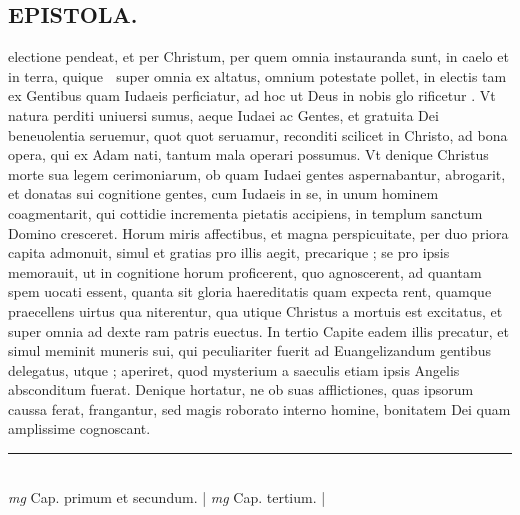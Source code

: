 \documentclass{article}
\begin{document}
\begin{pages}
\section*{EPISTOLA.  }\pstart electione pendeat, et per Christum, per quem omnia instauranda sunt, in caelo et in terra, quique  super omnia ex altatus, omnium potestate pollet, in electis tam ex Gentibus quam Iudaeis perficiatur, ad hoc ut Deus in nobis glo rificetur .  Vt natura perditi uniuersi sumus, aeque Iudaei ac Gentes, et gratuita Dei beneuolentia seruemur, quot quot seruamur, reconditi scilicet in Christo, ad bona opera, qui ex Adam nati, tantum mala operari possumus.  Vt denique  Christus morte sua legem cerimoniarum, ob quam Iudaei gentes aspernabantur, abrogarit, et donatas sui cognitione gentes, cum Iudaeis in se, in unum hominem coagmentarit, qui cottidie incrementa pietatis accipiens, in templum sanctum Domino cresceret.   \pend\pstart Horum miris affectibus, et magna perspicuitate, per duo priora capita admonuit, simul et gratias pro illis aegit, precarique ; se pro ipsis memorauit, ut in cognitione horum proficerent, quo agnoscerent, ad quantam spem uocati essent, quanta sit gloria haereditatis quam expecta rent, quamque  praecellens uirtus qua niterentur, qua utique  Christus a mortuis est excitatus, et super omnia ad dexte ram patris euectus.  In tertio Capite eadem illis precatur, et simul meminit muneris sui, qui peculiariter fuerit ad Euangelizandum gentibus delegatus, utque ; aperiret, quod mysterium a saeculis etiam ipsis Angelis absconditum fuerat.  Denique  hortatur, ne ob suas afflictiones, quas ipsorum caussa ferat, frangantur, sed magis roborato interno homine, bonitatem Dei quam amplissime cognoscant.   \pend
\vspace{0.5cm}\noindent
\vspace{0.2cm}\rule{1cm}{0.2pt}\\ 
\hspace{0.2cm}\textit{mg}
\footnotesize Cap.  primum et secundum.  
\normalsize| 
\hspace{0.2cm}\textit{mg}
\footnotesize Cap.  tertium.  
\normalsize| 

\end{pages}
\end{document}
